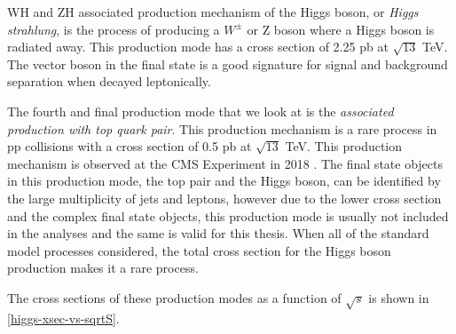 WH and ZH associated production mechanism of the Higgs boson, or \emph{Higgs strahlung}, is the process of producing a $W^\pm$ or Z boson where a Higgs boson is radiated away. This production mode has a cross section of 2.25 pb at $\sqrt{13}$ TeV. The vector boson in the final state is a good signature for signal and background separation when decayed leptonically.

The fourth and final production mode that we look at is the \emph{associated production with top quark pair}. This production mechanism is a rare process in pp collisions with a cross section of 0.5 pb at $\sqrt{13}$ TeV. This production mechanism is observed at the CMS Experiment in 2018 \cite{ttH-higgs}. The final state objects in this production mode, the top pair and the Higgs boson, can be identified by the large multiplicity of jets and leptons, however due to the lower cross section and the complex final state objects, this production mode is usually not included in the analyses and the same is valid for this thesis. When all of the standard model processes considered, the total cross section for the Higgs boson production makes it a rare process.

The cross sections of these production modes as a function of $\sqrt{s}$ is shown in \autoref{higgs-xsec-vs-sqrtS}.

